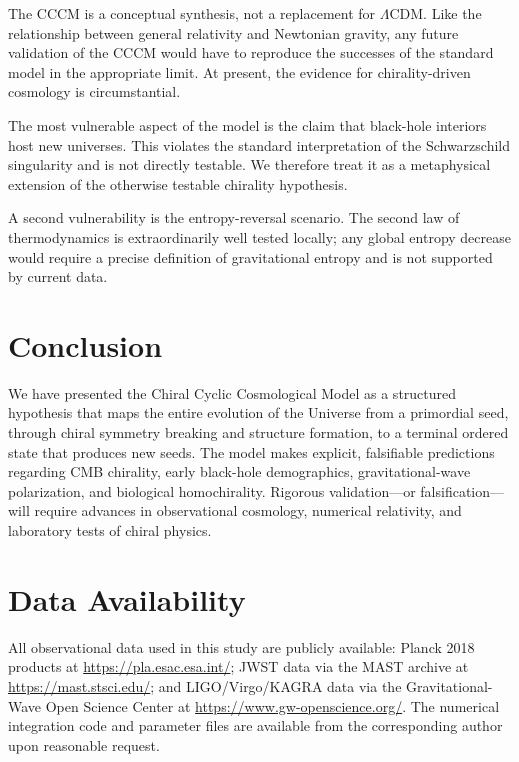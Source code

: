 \documentclass[a4paper,11pt]{article}
\newcommand{\LCDM}{$\Lambda$CDM}
\newcommand{\CCCM}{CCCM}
\begin{document}
The \CCCM{} is a conceptual synthesis, not a replacement for \LCDM. Like the relationship between general relativity and Newtonian gravity, any future validation of the \CCCM{} would have to reproduce the successes of the standard model in the appropriate limit. At present, the evidence for chirality-driven cosmology is circumstantial.

The most vulnerable aspect of the model is the claim that black-hole interiors host new universes. This violates the standard interpretation of the Schwarzschild singularity and is not directly testable. We therefore treat it as a metaphysical extension of the otherwise testable chirality hypothesis.

A second vulnerability is the entropy-reversal scenario. The second law of thermodynamics is extraordinarily well tested locally; any global entropy decrease would require a precise definition of gravitational entropy \citep{Clifton2013} and is not supported by current data.

\section{Conclusion}
\label{sec:conclusion}

We have presented the Chiral Cyclic Cosmological Model as a structured hypothesis that maps the entire evolution of the Universe from a primordial seed, through chiral symmetry breaking and structure formation, to a terminal ordered state that produces new seeds. The model makes explicit, falsifiable predictions regarding CMB chirality, early black-hole demographics, gravitational-wave polarization, and biological homochirality. Rigorous validation---or falsification---will require advances in observational cosmology, numerical relativity, and laboratory tests of chiral physics.

\section*{Data Availability}

All observational data used in this study are publicly available: Planck 2018 products at \url{https://pla.esac.esa.int/}; JWST data via the MAST archive at \url{https://mast.stsci.edu/}; and LIGO/Virgo/KAGRA data via the Gravitational-Wave Open Science Center at \url{https://www.gw-openscience.org/}. The numerical integration code and parameter files are available from the corresponding author upon reasonable request.
\end{document}
